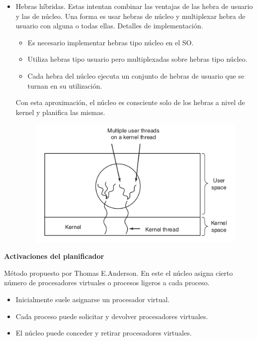 \documentclass{article}
\begin{document}
\begin{itemize}
\item Hebras híbridas. Estas intentan combinar las ventajas de las hebra de usuario y las de núcleo. Una forma es usar hebras de núcleo y multiplexar hebra de usuario con alguna o todas ellas. Detalles de implementación.
	\begin{itemize}
	\item Es necesario implementar hebras tipo núcleo en el SO.
	
	\item Utiliza hebras tipo usuario pero multiplexadas sobre hebras tipo núcleo.
	
	\item Cada hebra del núcleo ejecuta un conjunto de hebras de usuario que se turnan en su utilización.
	\end{itemize}
	
Con esta aproximación, el núcleo es consciente solo de los hebras a nivel de kernel y planifica las mismas.
\begin{figure}[h]
\centering
\includegraphics[scale=1,width=\textwidth]{hybrid.png}
\end{figure}
\end{itemize}

\textbf{Activaciones del planificador}

Método propuesto por Thomas E.Anderson. En este el núcleo asigna cierto número de procesadores virtuales o procesos ligeros a cada proceso. 
	\begin{itemize}
	\item Inicialmente suele asignarse un procesador virtual.
	
	\item Cada proceso puede solicitar y devolver procesadores virtuales.
	
	\item El núcleo puede conceder y retirar procesadores virtuales.
	\end{itemize}
	
\end{document}
